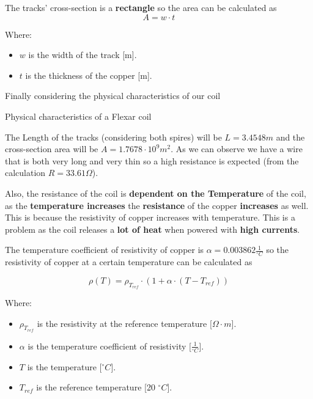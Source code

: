 \begin{samepage}
    The tracks' cross-section is a \textbf{rectangle} so the area can be calculated as
    \begin{equation*}
        A = w \cdot t
    \end{equation*}
    \nopagebreak
        
    Where:
    \begin{itemize}
        \item \( w \) is the width of the track [m].
        \item \( t \) is the thickness of the copper [m].
    \end{itemize}
\end{samepage}

Finally considering the physical characteristics of our coil
\begin{table}[H]
    \centering
    \resizebox{.8\linewidth}{!}{
        
    }
    \caption{Physical characteristics of a Flexar coil}
    \label{tab: Physical characteristics of a Flexar coil}
\end{table}

The Length of the tracks (considering both spires) will be $L = 3.4548 m $ and the cross-section area will be $A = 1.7678\cdot10^{9}m^2$.
As we can observe we have a wire that is both very long and very thin so a high resistance is expected (from the calculation $R = 33.61 \Omega $).

Also, the resistance of the coil is \textbf{dependent on the Temperature} of the coil, as the \textbf{temperature increases} the \textbf{resistance} of the copper \textbf{increases} as well. This is because the resistivity of copper increases with temperature. This is a problem as the coil releases a \textbf{lot of heat} when powered with \textbf{high currents}.

\begin{samepage}
    The temperature coefficient of resistivity of copper is $\alpha = 0.003862 \frac{1}{^{\circ}C}$ so the resistivity of copper at a certain temperature can be calculated as
    \nopagebreak

    \begin{equation*}
        \rho(T) = \rho_{T_{ref}} \cdot (1 + \alpha \cdot (T - T_{ref}))
    \end{equation*}
    \nopagebreak
        
    Where: 
    \begin{itemize}
        \item \( \rho_{T_{ref}} \) is the resistivity at the reference temperature [\(\Omega \cdot m\)].
        \item \( \alpha \) is the temperature coefficient of resistivity [\(\frac{1}{^{\circ}C}\)].
        \item \( T \) is the temperature [\(^{\circ}C\)].
        \item \( T_{ref} \) is the reference temperature [20 \(^{\circ}C\)].
    \end{itemize}
\end{samepage}
    
